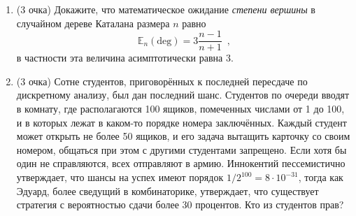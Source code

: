 \documentclass[a5paper]{article}
\theoremstyle{definition}
\begin{document}
\begin{enumerate}
(i) Найдите производящую функцию от трёх переменных для
полученного класса.

(ii) Найдите среднее количество слагаемых в разложении.
\item(3 очка) Докажите, что математическое ожидание \textit{степени вершины} в
случайном дереве Каталана размера \( n \) равно
\begin{equation}
    \mathbb E_n (\text{deg}) = 3 \dfrac{n-1}{n+1} \enspace ,
\end{equation}
в частности эта величина асимптотически равна \( 3 \).
\item(3 очка) Сотне студентов, приговорённых к последней пересдаче по дискретному анализу, был дан
последний шанс. Студентов по очереди вводят в комнату, где располагаются 100
ящиков, помеченных числами от 1 до 100, и в которых лежат в каком-то порядке
номера заключённых. Каждый студент может открыть не более 50 ящиков, и его
задача вытащить карточку со своим номером, общаться при этом с другими
студентами запрещено. Если хотя бы один не справляются, всех отправляют в армию.
Иннокентий пессемистично утверждает, что шансы на успех имеют порядок \(1 / 2^{100}
 = 8 \cdot 10^{-31}\), тогда как Эдуард, более сведущий в комбинаторике,
утверждает, что существует стратегия с вероятностью сдачи более 30 процентов.
Кто из студентов прав?
\end{enumerate}
\footnotesize


    
\end{document}
